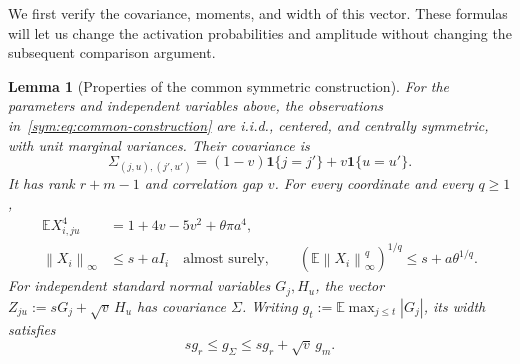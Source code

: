 \documentclass[11pt,letterpaper,twoside,leqno]{article}
\theoremstyle{bookplain}
\newtheorem{lemma}{Lemma}
\theoremstyle{bookremark}
\newcommand{\E}{\mathbb E}
\newcommand{\norm}[1]{\left\lVert#1\right\rVert}
\newcommand{\ind}{\mathbf 1}
\begin{document}
We first verify the covariance, moments, and width of this vector.
These formulas will let us change the activation probabilities
and amplitude without changing the subsequent comparison argument.

\begin{lemma}[Properties of the common symmetric construction]
\label{lower:family-properties}
For the parameters and independent variables above, the observations
in~\eqref{sym:eq:common-construction} are i.i.d., centered, and
centrally symmetric, with unit marginal variances. Their covariance is
\begin{equation}
 \Sigma_{(j,u),(j',u')}=(1-v)\ind\{j=j'\}+v\ind\{u=u'\}.
 \label{sym:eq:common-covariance}
\end{equation}
It has rank $r+m-1$ and correlation gap $v$. For every
coordinate and every $q\ge1$,
\begin{align}
 \E X_{i,ju}^4
 &=1+4v-5v^2+\theta\pi a^4,
 \label{lower:eq:family-fourth}\\
 \norm{X_i}_\infty&\le s+aI_i\quad\text{almost surely},\qquad
 (\E\norm{X_i}_\infty^q)^{1/q}\le s+a\theta^{1/q}.
 \label{lower:eq:family-envelope}
\end{align}
For independent standard normal variables $G_j,H_u$, the vector
$Z_{ju}:=sG_j+\sqrt v\,H_u$ has covariance $\Sigma$.
Writing $g_t:=\E\max_{j\le t}|G_j|$, its width satisfies
\begin{equation}
 s g_r\le g_\Sigma\le s g_r+\sqrt v\,g_m.
 \label{lower:eq:family-width}
\end{equation}
\end{lemma}
\end{document}
